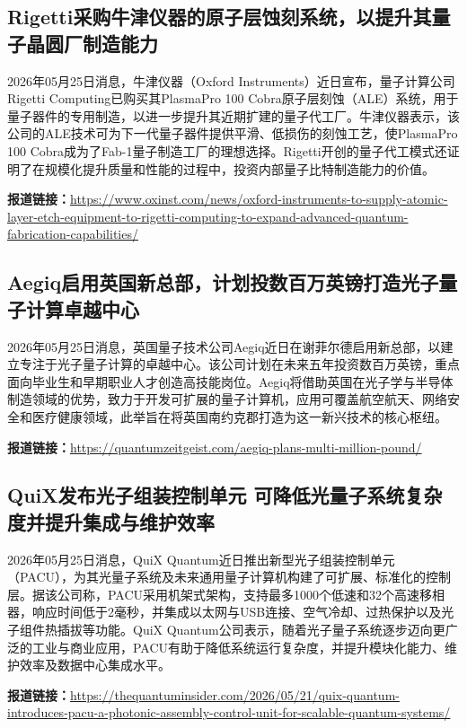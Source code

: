 \documentclass[12pt,a4paper]{ctexart}
\begin{document}
\subsection{ Rigetti采购牛津仪器的原子层蚀刻系统，以提升其量子晶圆厂制造能力 }

2026年05月25日消息，牛津仪器（Oxford Instruments）近日宣布，量子计算公司Rigetti Computing已购买其PlasmaPro 100 Cobra原子层刻蚀（ALE）系统，用于量子器件的专用制造，以进一步提升其近期扩建的量子代工厂。牛津仪器表示，该公司的ALE技术可为下一代量子器件提供平滑、低损伤的刻蚀工艺，使PlasmaPro 100 Cobra成为了Fab-1量子制造工厂的理想选择。Rigetti开创的量子代工模式还证明了在规模化提升质量和性能的过程中，投资内部量子比特制造能力的价值。

\noindent\textbf{报道链接：}\url{https://www.oxinst.com/news/oxford-instruments-to-supply-atomic-layer-etch-equipment-to-rigetti-computing-to-expand-advanced-quantum-fabrication-capabilities/ }

\subsection{ Aegiq启用英国新总部，计划投数百万英镑打造光子量子计算卓越中心 }

2026年05月25日消息，英国量子技术公司Aegiq近日在谢菲尔德启用新总部，以建立专注于光子量子计算的卓越中心。该公司计划在未来五年投资数百万英镑，重点面向毕业生和早期职业人才创造高技能岗位。Aegiq将借助英国在光子学与半导体制造领域的优势，致力于开发可扩展的量子计算机，应用可覆盖航空航天、网络安全和医疗健康领域，此举旨在将英国南约克郡打造为这一新兴技术的核心枢纽。

\noindent\textbf{报道链接：}\url{https://quantumzeitgeist.com/aegiq-plans-multi-million-pound/ }

\subsection{ QuiX发布光子组装控制单元 可降低光量子系统复杂度并提升集成与维护效率 }

2026年05月25日消息，QuiX Quantum近日推出新型光子组装控制单元（PACU），为其光量子系统及未来通用量子计算机构建了可扩展、标准化的控制层。据该公司称，PACU采用机架式架构，支持最多1000个低速和32个高速移相器，响应时间低于2毫秒，并集成以太网与USB连接、空气冷却、过热保护以及光子组件热插拔等功能。QuiX Quantum公司表示，随着光子量子系统逐步迈向更广泛的工业与商业应用，PACU有助于降低系统运行复杂度，并提升模块化能力、维护效率及数据中心集成水平。

\noindent\textbf{报道链接：}\url{https://thequantuminsider.com/2026/05/21/quix-quantum-introduces-pacu-a-photonic-assembly-control-unit-for-scalable-quantum-systems/ }
\end{document}
